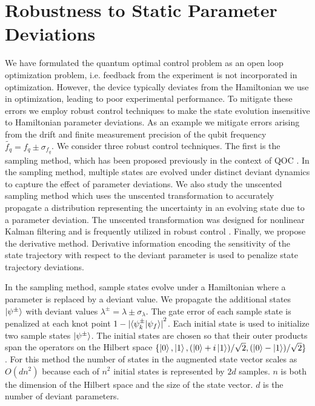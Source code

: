 \section{Robustness to Static Parameter Deviations \label{sec:static}}
We have formulated the quantum optimal control
problem as an open loop optimization problem, i.e.
feedback from the experiment is not incorporated in optimization.
However, the device typically deviates from the Hamiltonian we use in optimization,
leading to poor experimental performance. To mitigate
these errors we employ robust control techniques
to make the state evolution insensitive to Hamiltonian
parameter deviations. As an example
we mitigate errors arising from the drift and finite measurement
precision of the qubit frequency $\tilde{f_{q}} = f_{q} \pm \sigma_{f_{q}}$.
We consider three robust control techniques.
The first is the sampling method, which has
been proposed previously in the context of QOC
\cite{rembold2020introduction, reinhold2019controlling, carvalho2020error}. In the
sampling method, multiple states are evolved under distinct deviant dynamics
to capture the effect of parameter deviations. We also
study the unscented sampling method which uses the unscented
transformation to accurately propagate a distribution
representing the uncertainty in an evolving state
due to a parameter deviation.
The unscented transformation was designed for nonlinear Kalman
filtering and is frequently utilized in robust control
\cite{julier2004unscented, lee2013sigma, manchester2016derivative}.
Finally, we propose the derivative method. Derivative
information encoding the sensitivity of the
state trajectory with respect to the deviant parameter
is used to penalize state trajectory deviations.

In the sampling method, sample states evolve under a
Hamiltonian where a parameter is replaced by
a deviant value. We propagate the additional states $\ket{\psi^{\pm}}$ with
deviant values $\lambda^{\pm} = \lambda \pm \sigma_{\lambda}$.
The gate error of each sample state is 
penalized at each knot point
$1 - {\lvert \braket{\psi^{\pm}_{k} | \psi_{f}} \rvert}^{2}$.
Each initial state is used to initialize two
sample states $\ket{\psi^{\pm}}$.
The initial states are chosen so
that their outer products span the operators on the
Hilbert space $\{\ket{0}, \ket{1}, (\ket{0} + i\ket{1}) / \sqrt{2},
(\ket{0} - \ket{1}) / \sqrt{2}\}$ \cite{chow2009randomized}.
For this method the number of states in the augmented state vector
scales as $O(dn^{2})$ because each of $n^{2}$ initial
states is represented by $2d$ samples. $n$ is both the dimension of the Hilbert space
and the size of the state vector. $d$ is the number of deviant parameters.

